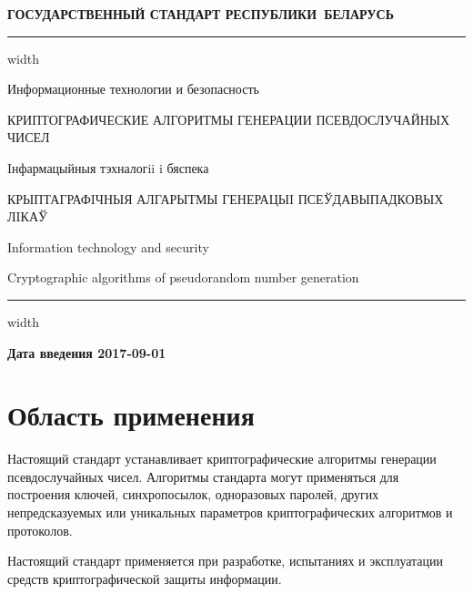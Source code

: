 \newpage
\setcounter{page}{1}
\pagestyle{headings}

\begin{center}
{\bfseries
ГОСУДАРСТВЕННЫЙ СТАНДАРТ РЕСПУБЛИКИ~БЕЛАРУСЬ
\vskip 2pt
\hrule width\textwidth

\vskip 9pt

Информационные технологии и безопасность

КРИПТОГРАФИЧЕСКИЕ АЛГОРИТМЫ ГЕНЕРАЦИИ ПСЕВДОСЛУЧАЙНЫХ ЧИСЕЛ

\vskip 9pt

Iнфармацыйныя тэхналогii i бяспека

КРЫПТАГРАФIЧНЫЯ АЛГАРЫТМЫ ГЕНЕРАЦЫI ПСЕЎДАВЫПАДКОВЫХ ЛIКАЎ
} %

\vskip 9pt

Information technology and security

Cryptographic algorithms of pseudorandom number generation

\vskip 4pt                
\hrule width \textwidth
\end{center}

\mbox{}\hfill{\bfseries Дата введения 2017-09-01}

\chapter{Область применения}

Настоящий стандарт устанавливает криптографические алгоритмы генерации 
псевдослучайных чисел. Алгоритмы стандарта могут применяться 
для построения ключей, синхропосылок, одноразовых паролей,
других непредсказуемых или уникальных параметров 
криптографических алгоритмов и протоколов.

Настоящий стандарт применяется при разработке, испытаниях и эксплуатации 
средств криптографической защиты информации.


